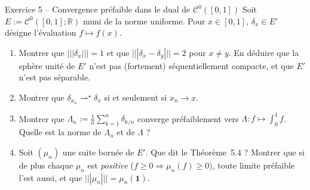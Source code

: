 \documentclass[11pt,a4paper]{article}
\newcommand{\R}{\mathbb{R}}
\newcommand{\opnorm}[1]{|\!|\!|#1|\!|\!|}
\newcommand{\Cz}{\mathcal{C}^0}
\newcommand{\wks}{\rightharpoonup^{\!\star}}
\theoremstyle{definition}
\begin{document}
\begin{exo}{Exercice 5 -- Convergence préfaible dans le dual de $\Cz([0,1])$}
Soit $E:=\Cz([0,1];\R)$ muni de la norme uniforme. Pour $x\in[0,1]$, $\delta_x\in E'$ désigne l'évaluation $f\mapsto f(x)$.
\begin{enumerate}[label=(\alph*)]
  \item Montrer que $\opnorm{\delta_x}=1$ et que $\opnorm{\delta_x-\delta_y}=2$ pour $x\ne y$. En déduire que la sphère unité de $E'$ n'est pas (fortement) séquentiellement compacte, et que $E'$ n'est pas séparable.
  \item Montrer que $\delta_{x_n}\wks\delta_x$ si et seulement si $x_n\to x$.
  \item Montrer que $\Lambda_n:=\frac1n\sum_{k=1}^n\delta_{k/n}$ converge préfaiblement vers $\Lambda:f\mapsto\int_0^1f$. Quelle est la norme de $\Lambda_n$ et de $\Lambda$ ?
  \item Soit $(\mu_n)$ une suite bornée de $E'$. Que dit le Théorème~5.4 ? Montrer que si de plus chaque $\mu_n$ est \emph{positive} ($f\ge0\Rightarrow\mu_n(f)\ge0$), toute limite préfaible l'est aussi, et que $\opnorm{\mu_n}=\mu_n(\mathbf 1)$.
\end{enumerate}
\end{exo}
\end{document}
